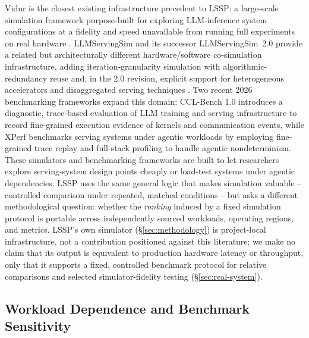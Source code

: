 Vidur is the closest existing infrastructure precedent to LSSP: a
large-scale simulation framework purpose-built for exploring LLM-inference
system configurations at a fidelity and speed unavailable from
running full experiments on real hardware \citep{vidur2024}. LLMServingSim
and its successor LLMServingSim~2.0 provide a related but architecturally
different hardware/software co-simulation infrastructure, adding
iteration-granularity simulation with algorithmic-redundancy reuse and,
in the 2.0 revision, explicit support for heterogeneous accelerators and
disaggregated serving techniques \citep{llmservingsim2024,llmservingsim2_2025}.
Two recent 2026 benchmarking frameworks expand this domain: CCL-Bench 1.0
\citep{ding2026cclbench} introduces a diagnostic, trace-based evaluation
of LLM training and serving infrastructure to record fine-grained execution
evidence of kernels and communication events, while XPerf \citep{wang2026xperf}
benchmarks serving systems under agentic workloads by employing fine-grained
trace replay and full-stack profiling to handle agentic nondeterminism.
These simulators and benchmarking frameworks are built to let researchers
explore serving-system design points cheaply or load-test systems under
agentic dependencies. LSSP uses the same general logic that makes simulation
valuable -- controlled comparison under repeated, matched conditions -- but
asks a different methodological question: whether the \emph{ranking} induced
by a fixed simulation protocol is portable across independently sourced
workloads, operating regions, and metrics. LSSP's own simulator
(\S\ref{sec:methodology}) is project-local infrastructure, not a
contribution positioned against this literature; we make no claim that its
output is equivalent to production hardware latency or throughput, only that
it supports a fixed, controlled benchmark protocol for relative comparisons
and selected simulator-fidelity testing (\S\ref{sec:real-system}).

\subsection{Workload Dependence and Benchmark Sensitivity}
\label{sec:related-dependence}

